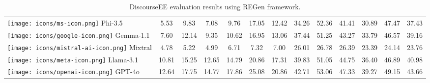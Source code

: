 \begin{table*}[h!]
\begin{tabular}{l|ccc|ccc|ccc|ccc}
\texttt{[image: icons/ms-icon.png]} Phi-3.5 & 5.53 & 9.83 & 7.08 & 9.76 & 17.05 & 12.42 & 34.26 & 52.36 & 41.41 & 30.89 & 47.47 & 37.43 \\
\texttt{[image: icons/google-icon.png]} Gemma-1.1 & 7.60 & 12.14 & 9.35 & 10.62 & 16.95 & 13.06 & 37.44 & 51.25 & 43.27 & 33.79 & 46.57 & 39.16 \\
\texttt{[image: icons/mistral-ai-icon.png]} Mixtral & 4.78 & 5.22 & 4.99 & 6.71 & 7.32 & 7.00 & 26.01 & 26.78 & 26.39 & 23.39 & 24.14 & 23.76 \\
\texttt{[image: icons/meta-icon.png]} Llama-3.1 & 10.81 & 15.25 & 12.65 & 14.79 & 20.86 & 17.31 & 39.83 & 51.05 & 44.75 & 36.40 & 46.89 & 40.98 \\
\texttt{[image: icons/openai-icon.png]} GPT-4o & 12.64 & 17.75 & 14.77 & 17.86 & 25.08 & 20.86 & 42.71 & 53.06 & 47.33 & 39.27 & 49.15 & 43.66 \\

\bottomrule 
\end{tabular}
\caption{DiscourseEE evaluation results using REGen framework.}
\label{DiscourseEE-all-results}
\end{table*}

